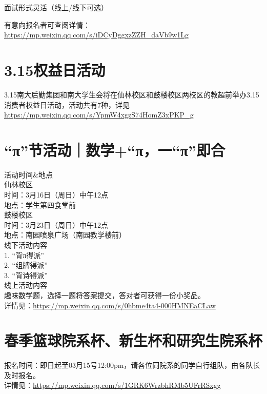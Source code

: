 \documentclass[letterpaper, 12pt]{article}
\begin{document}
\begin{multicols}{2}
面试形式灵活（线上/线下可选）

有意向报名者可查阅详情：\url{https://mp.weixin.qq.com/s/iDCyDggxzZZH_daVb9w1Lg}\\
\section{3.15权益日活动}
3.15南大后勤集团和南大学生会将在仙林校区和鼓楼校区两校区的教超前举办3.15消费者权益日活动，活动共有7种，详见\url{https://mp.weixin.qq.com/s/YpmW4xgzS74HomZ3xPKP_g}




\section{“π”节活动｜数学+“π，一“π”即合}
活动时间\&地点\\
仙林校区\\
时间：3月16日（周日）中午12点\\
地点：学生第四食堂前\\
鼓楼校区\\
时间：3月23日（周日）中午12点\\
地点：南园喷泉广场（南园教学楼前）\\
线下活动内容\\
1. “背π得派”\\
2. “组牌得派”\\
3. “背诗得派”\\
线上活动内容\\
趣味数学题，选择一题将答案提交，答对者可获得一份小奖品。\\

 详情见：\url{https://mp.weixin.qq.com/s/0hbme4ta4-000HMNEaCLaw}

\section{春季篮球院系杯、新生杯和研究生院系杯}
报名时间：即日起至03月15号12:00pm，请各位同院系的同学自行组队，由各队长及时报名。\\
详情见：\url{https://mp.weixin.qq.com/s/1GRK6WrzbhRMb5UFrRSxgg}


\end{multicols}
\end{document}
